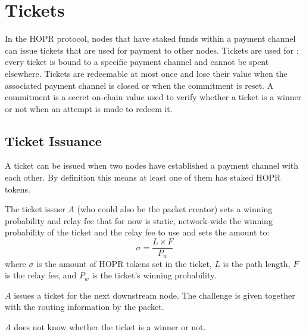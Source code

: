 \section{Tickets}
\label{sec:tickets}

In the HOPR protocol, nodes that have staked funds within a payment channel can issue tickets that are used for payment to other nodes. Tickets are used for ; every ticket is bound to a specific payment channel and cannot be spent elsewhere. Tickets are redeemable at most once and lose their value when the associated payment channel is closed or when the commitment is reset. A commitment is a secret on-chain value used to verify whether a ticket is a winner or not when an attempt is made to redeem it.

\subsection{Ticket Issuance}

A ticket can be issued when two nodes have established a payment channel with each other. By definition this means at least one of them has staked HOPR tokens.

The ticket issuer $A$ (who could also be the packet creator) sets a winning probability and relay fee that for now is static, network-wide the winning probability of the ticket and the relay fee to use and sets the amount to: $$\sigma=\dfrac{L\times F}{P_w}$$ where $\sigma$ is the amount of HOPR tokens set in the ticket, $L$ is the path length, $F$ is the relay fee, and $P_w$ is the ticket's winning probability.

$A$ issues a ticket for the next downstream node. The challenge is given together with the routing information by the packet.

$A$ does not know whether the ticket is a winner or not.

